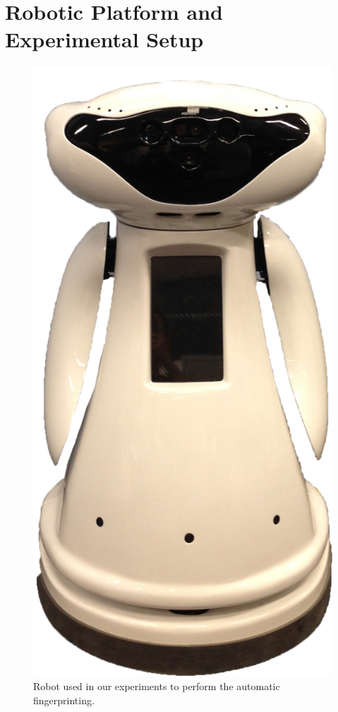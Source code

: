 \section{ Robotic Platform and Experimental Setup}
\label{sec:experimental_setup}



\begin{figure}
    \centering
    \includegraphics[scale=0.07]{pictures/robot}
    \caption{Robot used in our experiments to perform the automatic fingerprinting.}
     \label{robot}
\end{figure}

